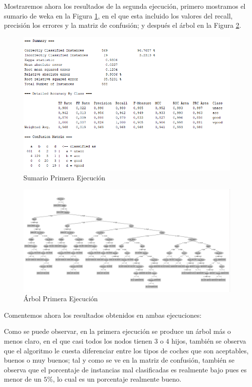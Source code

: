 \documentclass[a4paper, 11pt, twoside, openany, onecolumn, final]{memoir}
\begin{document}
	Mostraremos ahora los resultados de la segunda ejecución, primero mostramos el sumario de weka en la Figura \ref{SumarioSegundaEjecucion}, en el que esta incluido los valores del recall, precisión los errores y la matriz de confusión; y después el árbol en la Figura \ref{ArbolSegundaEjecucion}.
	\begin{figure}
  		\centering
   		\includegraphics{Imagenes/SummaryConEntreYValYBinarySplit}
  		\caption{Sumario Primera Ejecución}
  		\label{SumarioSegundaEjecucion}
	\end{figure}	
	
	\begin{figure}
  		\centering
   		\includegraphics[width=1\textwidth]{Imagenes/ArbolConEntreYValYBinarySplit}
  		\caption{Árbol Primera Ejecución}
  		\label{ArbolSegundaEjecucion}
	\end{figure}
	
	Comentemos ahora los resultados obtenidos en ambas ejecuciones:
	
	Como se puede observar, en la primera ejecución se produce un árbol más o menos claro, en el que casi todos los nodos tienen $3$ o $4$ hijos, también se observa que el algoritmo le cuesta diferenciar entre los tipos de coches que son aceptables, buenos o muy buenos; tal y como se ve en la matriz de confusión, también se observa que el porcentaje de instancias mal clasificadas es realmente bajo pues es menor de un $5\%$, lo cual es un porcentaje realmente bueno.
	
\end{document}
